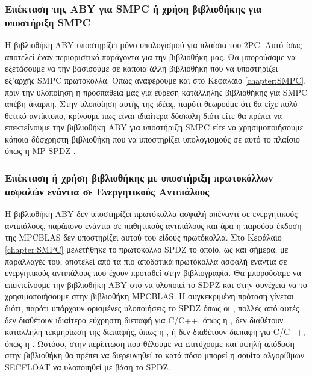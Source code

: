 \subsubsection{Επέκταση της ABY για SMPC ή χρήση βιβλιοθήκης για υποστήριξη SMPC}
Η βιβλιοθήκη ABY υποστηρίζει μόνο υπολογισμού για πλαίσια του 2PC. Αυτό ίσως αποτελεί έναν περιοριστικό παράγοντα για την βιβλιοθήκη μας. Θα μπορούσαμε να εξετάσουμε να την βασίσουμε σε κάποια άλλη βιβλιοθήκη που να υποστηρίζει εξ'αρχής SMPC πρωτόκολλα. Όπως αναφέρουμε και στο Κεφάλαιο \ref{chapter:SMPC}, πριν την υλοποίηση η προσπάθεια μας για εύρεση κατάλληλης βιβλιοθήκης για SMPC απέβη άκαρπη. Στην υλοποίηση αυτής της ιδέας, παρότι θεωρούμε ότι θα είχε πολύ θετικό αντίκτυπο, κρίνουμε πως είναι ιδιαίτερα δύσκολη διότι είτε θα πρέπει να επεκτείνουμε την βιβλιοθήκη ABY για υποστήριξη SMPC είτε να χρησιμοποιήσουμε κάποια δύσχρηστη βιβλιοθήκη που να υποστηρίζει υπολογισμούς σε αυτό το πλαίσιο όπως η MP-SPDZ \cite{mp-spdz}.

\subsubsection{Επέκταση ή χρήση βιβλιοθήκης με υποστήριξη πρωτοκόλλων ασφαλών ενάντια σε Ενεργητικούς Αντιπάλους}
Η βιβλιοθήκη ABY δεν υποστηρίζει πρωτόκολλα ασφαλή απέναντι σε ενεργητικούς αντιπάλους, παράπονο ενάντια σε παθητικούς αντιπάλους και άρα η παρούσα έκδοση της MPCBLAS δεν υποστηρίζει αυτού του είδους πρωτόκολλα. Στο Κεφάλαιο \ref{chapter:SMPC} μελετήθηκε το πρωτόκολλο SPDZ το οποίο, ως και σήμερα, με παραλλαγές του, αποτελεί από τα πιο αποδοτικά πρωτόκολλα ασφαλή ενάντια σε ενεργητικούς αντιπάλους που έχουν προταθεί στην βιβλιογραφία. Θα μπορούσαμε να επεκτείνουμε την βιβλιοθήκη ABY στο να υλοποιεί το SDPZ και στην συνέχεια να το χρησιμοποιήσουμε στην βιβλιοθήκη MPCBLAS. Η συγκεκριμένη πρόταση γίνεται διότι, παρότι υπάρχουν ορισμένες υλοποιήσεις το SPDZ όπως οι \cite{mp-spdz} \cite{aly2021scale} \cite{FRESCO}, πολλές από αυτές δεν διαθέτουν ιδιαίτερα εύχρηστη διεπαφή για C/C++, όπως η \cite{aly2021scale}, δεν διαθέτουν κατάλληλη τεκμηρίωση της διεπαφής, όπως η \cite{mp-spdz}, ή δεν διαθέτουν διεπαφή για C/C++, όπως η \cite{FRESCO}. Ωστόσο, στην περίπτωση που θέλουμε να επιτύχουμε και υψηλή απόδοση στην βιβλιοθήκη θα πρέπει να διερευνηθεί το κατά πόσο μπορεί η σουίτα αλγορίθμων SECFLOAT να υλοποιηθεί με βάση το SPDZ.